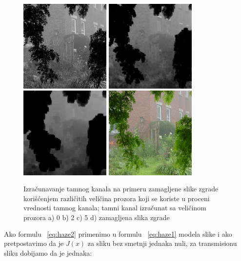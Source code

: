 \documentclass[a4paper,12pt,titlepage]{article}
\begin{document}
\begin{figure}[ht!]
\centering
\includegraphics[width=45mm]{img/hazeDC0.png}
\includegraphics[width=45mm]{img/hazeDC2.png}
\includegraphics[width=45mm]{img/hazeDC5.png}
\includegraphics[width=45mm]{img/haze.png}
\caption{Izračunavanje tamnog kanala na primeru zamagljene slike zgrade korišćenjem različitih veličina prozora koji se koriste u proceni vrednosti tamnog kanala; tamni kanal izračunat sa veličinom prozora a) 0 b) 2 c) 5 d) zamagljena slika zgrade}
\label{TamniKanal}
\end{figure} 

Ako formulu ~\ref{eq:haze2} primenimo u formulu ~\ref{eq:haze1} modela slike i ako pretpostavimo da je $J(x)$ za sliku bez smetnji jednaka nuli, za transmisionu sliku dobijamo da je jednaka:
\end{document}
